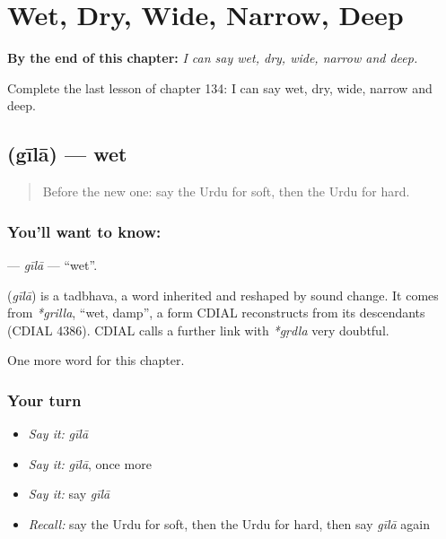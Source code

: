 
\chapter{Wet, Dry, Wide, Narrow, Deep}
\label{ch:ur-wet-dry-wide-narrow-deep}

\begin{chapteropening}
\textbf{By the end of this chapter:} \emph{I can say wet, dry, wide, narrow and deep.}

Complete the last lesson of chapter 134: I can say wet, dry, wide, narrow and deep.
\end{chapteropening}

\section[\texorpdfstring{\ur{گیلا} (gīlā)}{گیلا (gīlā)}]{ (gīlā) — wet}

\label{lesson:UR-C134-gila}



\begin{quote}
Before the new one: say the Urdu for soft, then the Urdu for hard.
\end{quote}

\subsection*{You'll want to know: }
\textbf{} — \emph{gīlā} — \textquotedblleft{}wet\textquotedblright{}.

\begin{cousinweb}
\textbf{} (\emph{gīlā}) is a tadbhava, a word inherited and reshaped by sound change. It comes from \emph{*grilla}, \textquotedblleft{}wet, damp\textquotedblright{}, a form CDIAL reconstructs from its descendants (CDIAL 4386). CDIAL calls a further link with \emph{*gṛdla} very doubtful.
\end{cousinweb}

\begin{grammarlens}[title={What you've built}]
One more word for this chapter.
\end{grammarlens}

\subsection*{Your turn}
\begin{itemize}
\raggedright
  \item \emph{Say it:} \emph{gīlā}
  \item \emph{Say it:} \emph{gīlā}, once more
  \item \emph{Say it:} say \emph{gīlā}
  \item \emph{Recall:} say the Urdu for soft, then the Urdu for hard, then say \emph{gīlā} again
\end{itemize}

